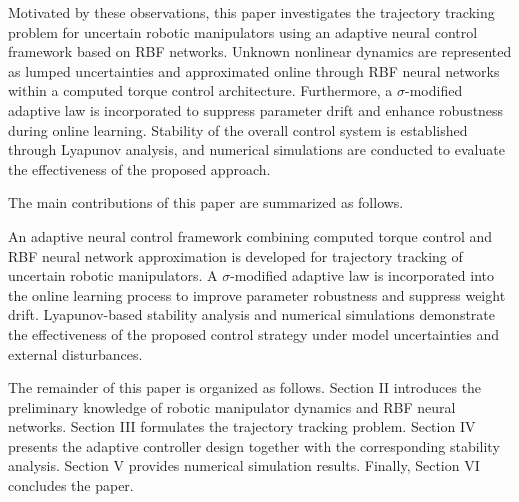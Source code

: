 Motivated by these observations, this paper investigates the trajectory tracking problem for uncertain robotic manipulators using an adaptive neural control framework based on RBF networks. Unknown nonlinear dynamics are represented as lumped uncertainties and approximated online through RBF neural networks within a computed torque control architecture. Furthermore, a $\sigma$-modified adaptive law is incorporated to suppress parameter drift and enhance robustness during online learning. Stability of the overall control system is established through Lyapunov analysis, and numerical simulations are conducted to evaluate the effectiveness of the proposed approach.

The main contributions of this paper are summarized as follows.

An adaptive neural control framework combining computed torque control and RBF neural network approximation is developed for trajectory tracking of uncertain robotic manipulators.
A $\sigma$-modified adaptive law is incorporated into the online learning process to improve parameter robustness and suppress weight drift.
Lyapunov-based stability analysis and numerical simulations demonstrate the effectiveness of the proposed control strategy under model uncertainties and external disturbances.

The remainder of this paper is organized as follows. Section II introduces the preliminary knowledge of robotic manipulator dynamics and RBF neural networks. Section III formulates the trajectory tracking problem. Section IV presents the adaptive controller design together with the corresponding stability analysis. Section V provides numerical simulation results. Finally, Section VI concludes the paper.